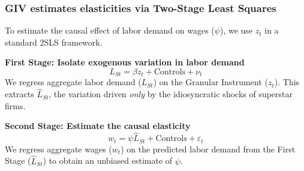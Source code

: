 \documentclass[aspectratio=169,11pt]{beamer}
\begin{document}
\begin{frame}[shrink=20]
    \frametitle{GIV estimates elasticities via Two-Stage Least Squares}

    \vspace{0.3cm}
    {\Large
        To estimate the causal effect of labor demand on wages ($\psi$), we use $z_t$ in a standard 2SLS framework.
    }

    \vspace{0.8cm}
    \textbf{First Stage: Isolate exogenous variation in labor demand}
    \vspace{0.2cm}
    \begin{equation*}
        L_{St} = \beta z_t + \text{Controls} + \nu_t
    \end{equation*}
    \vspace{0.1cm}
    We regress aggregate labor demand ($L_{St}$) on the Granular Instrument ($z_t$). This extracts $\widehat{L}_{St}$, the variation driven \emph{only} by the idiosyncratic shocks of superstar firms.

    \vspace{0.8cm}
    \textbf{Second Stage: Estimate the causal elasticity}
    \vspace{0.2cm}
    \begin{equation*}
        w_t = \psi \widehat{L}_{St} + \text{Controls} + \varepsilon_t
    \end{equation*}
    \vspace{0.1cm}
    We regress aggregate wages ($w_t$) on the predicted labor demand from the First Stage ($\widehat{L}_{St}$) to obtain an unbiased estimate of $\psi$.

\end{frame}
\end{document}
